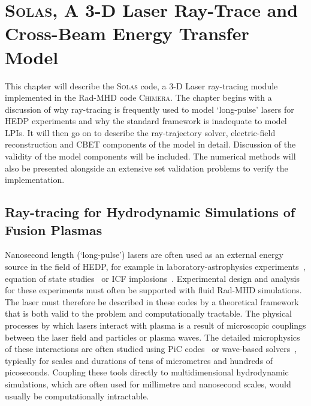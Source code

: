\chapter{\textsc{Solas}, A 3-D Laser Ray-Trace and Cross-Beam Energy Transfer Model}%
\label{chap:SOLAS}



This chapter will describe the \textsc{Solas} code, a 3-D Laser ray-tracing module implemented in the \ac{Rad-MHD} code \textsc{Chimera}.
The chapter begins with a discussion of why ray-tracing is frequently used to model `long-pulse' lasers for \ac{HEDP} experiments and why the standard framework is inadequate to model \ac{LPIs}.
It will then go on to describe the ray-trajectory solver, electric-field reconstruction and \ac{CBET} components of the model in detail.
Discussion of the validity of the model components will be included.
The numerical methods will also be presented alongside an extensive set validation problems to verify the implementation.


\section{Ray-tracing for Hydrodynamic Simulations of Fusion Plasmas}%
\label{sec:SOLAS_raytracing_for_ICF}

Nanosecond length (`long-pulse') lasers are often used as an external energy source in the field of \ac{HEDP}, for example in laboratory-astrophysics experiments~\cite{tzeferacos_laboratory_2018,fiuza_electron_2020,meinecke_strong_2022}, equation of state studies~\cite{kritcher_measurement_2020,smith_ramp_2014} or \ac{ICF} implosions~\cite{zylstra_burning_2022,slutz_high-gain_2012,williams_demonstration_2024}.
Experimental design and analysis for these experiments must often be supported with fluid \ac{Rad-MHD} simulations.
The laser must therefore be described in these codes by a theoretical framework that is both valid to the problem and computationally tractable.
The physical processes by which lasers interact with plasma is a result of microscopic couplings between the laser field and particles or plasma waves.
The detailed microphysics of these interactions are often studied using \ac{PiC} codes~\cite{nguyen_cross-beam_2021} or wave-based solvers~\cite{myatt_wave-based_2017}, typically for scales and durations of tens of micrometres and hundreds of picoseconds.
Coupling these tools directly to multidimensional hydrodynamic simulations, which are often used for millimetre and nanosecond scales, would usually be computationally intractable.

